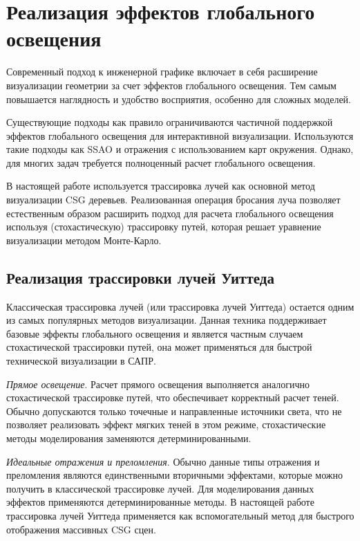 \section{Реализация эффектов глобального освещения}

Современный подход к инженерной графике включает в себя расширение визуализации геометрии за счет эффектов глобального освещения. Тем самым повышается наглядность и удобство восприятия, особенно для сложных моделей.

Существующие подходы как правило ограничиваются частичной поддержкой эффектов глобального освещения для интерактивной визуализации. Используются такие подходы как SSAO и отражения с использованием карт окружения. Однако, для многих задач требуется полноценный расчет глобального освещения.

В настоящей работе используется трассировка лучей как основной метод визуализации CSG деревьев. Реализованная операция бросания луча позволяет естественным образом расширить подход для расчета глобального освещения используя (стохастическую) трассировку путей, которая решает уравнение визуализации методом Монте-Карло.

\subsection{Реализация трассировки лучей Уиттеда}

Классическая трассировка лучей (или трассировка лучей Уиттеда) остается одним из самых популярных методов визуализации. Данная техника поддерживает базовые эффекты глобального освещения и является частным случаем стохастической трассировки путей, она может применяться для быстрой технической визуализации в САПР.

\textit{Прямое освещение}. Расчет прямого освещения выполняется аналогично стохастической трассировке путей, что обеспечивает корректный расчет теней. Обычно допускаются только точечные и направленные источники света, что не позволяет реализовать эффект мягких теней в этом режиме, стохастические методы моделирования заменяются детерминированными.

\textit{Идеальные отражения и преломления}. Обычно данные типы отражения и преломления являются единственными вторичными эффектами, которые можно получить в классической трассировке лучей. Для моделирования данных эффектов применяются детерминированные методы. В настоящей работе трассировка лучей Уиттеда применяется как вспомогательный метод для быстрого отображения массивных CSG сцен.

